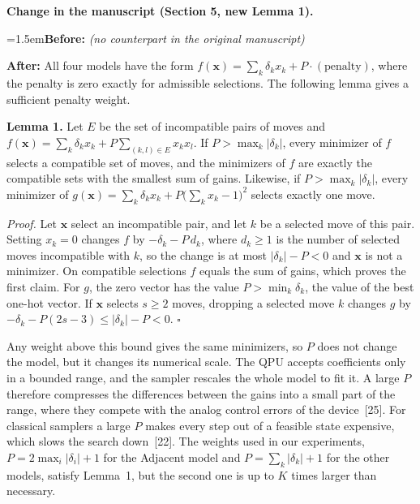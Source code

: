 \documentclass[12pt]{article}
\newcommand{\change}[3]{\par\smallskip\noindent\textbf{Change in the manuscript (#1).}\par
  {\leftskip=1.5em\noindent\textbf{Before:} #2\par\noindent\textbf{After:} #3\par}}
\begin{document}
\change{Section 5, new Lemma 1}{\textit{(no counterpart in the original manuscript)}}{All four models have the form $f(\mathbf{x})=\sum_k\delta_kx_k+P\cdot(\text{penalty})$, where the penalty is zero exactly for admissible selections. The following lemma gives a sufficient penalty weight.

\textbf{Lemma 1.} Let $E$ be the set of incompatible pairs of moves and $f(\mathbf{x})=\sum_k\delta_kx_k+P\sum_{(k,l)\in E}x_kx_l$. If $P>\max_k|\delta_k|$, every minimizer of $f$ selects a compatible set of moves, and the minimizers of $f$ are exactly the compatible sets with the smallest sum of gains. Likewise, if $P>\max_k|\delta_k|$, every minimizer of $g(\mathbf{x})=\sum_k\delta_kx_k+P\bigl(\sum_kx_k-1\bigr)^2$ selects exactly one move.

\emph{Proof.} Let $\mathbf{x}$ select an incompatible pair, and let $k$ be a selected move of this pair. Setting $x_k=0$ changes $f$ by $-\delta_k-P\,d_k$, where $d_k\ge 1$ is the number of selected moves incompatible with $k$, so the change is at most $|\delta_k|-P<0$ and $\mathbf{x}$ is not a minimizer. On compatible selections $f$ equals the sum of gains, which proves the first claim. For $g$, the zero vector has the value $P>\min_k\delta_k$, the value of the best one-hot vector. If $\mathbf{x}$ selects $s\ge 2$ moves, dropping a selected move $k$ changes $g$ by $-\delta_k-P(2s-3)\le|\delta_k|-P<0$. \hfill$\square$

Any weight above this bound gives the same minimizers, so $P$ does not change the model, but it changes its numerical scale. The QPU accepts coefficients only in a bounded range, and the sampler rescales the whole model to fit it. A large $P$ therefore compresses the differences between the gains into a small part of the range, where they compete with the analog control errors of the device~[25]. For classical samplers a large $P$ makes every step out of a feasible state expensive, which slows the search down~[22]. The weights used in our experiments, $P=2\max_i|\delta_i|+1$ for the Adjacent model and $P=\sum_k|\delta_k|+1$ for the other models, satisfy Lemma~1, but the second one is up to $K$ times larger than necessary.}
\end{document}
